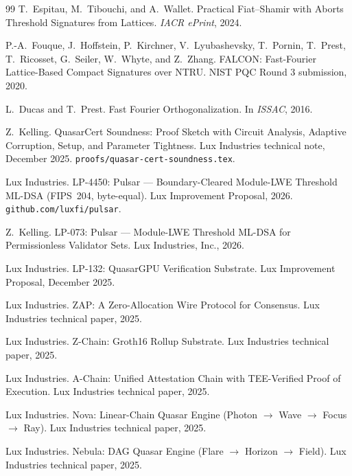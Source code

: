 \begin{thebibliography}{99}
T.~Espitau, M.~Tibouchi, and A.~Wallet.
\newblock Practical Fiat--Shamir with Aborts Threshold Signatures from
  Lattices.
\newblock \emph{IACR ePrint}, 2024.

P.-A.~Fouque, J.~Hoffstein, P.~Kirchner, V.~Lyubashevsky, T.~Pornin,
  T.~Prest, T.~Ricosset, G.~Seiler, W.~Whyte, and Z.~Zhang.
\newblock FALCON: Fast-Fourier Lattice-Based Compact Signatures over NTRU.
\newblock NIST PQC Round 3 submission, 2020.

L.~Ducas and T.~Prest.
\newblock Fast Fourier Orthogonalization.
\newblock In \emph{ISSAC}, 2016.

Z.~Kelling.
\newblock QuasarCert Soundness: Proof Sketch with Circuit Analysis,
  Adaptive Corruption, Setup, and Parameter Tightness.
\newblock Lux Industries technical note, December 2025.
\newblock \texttt{proofs/quasar-cert-soundness.tex}.

Lux Industries.
\newblock LP-4450: Pulsar --- Boundary-Cleared Module-LWE Threshold
  ML-DSA (FIPS~204, byte-equal).
\newblock Lux Improvement Proposal, 2026.
\newblock \texttt{github.com/luxfi/pulsar}.

Z.~Kelling.
\newblock LP-073: Pulsar --- Module-LWE Threshold ML-DSA for
  Permissionless Validator Sets.
\newblock Lux Industries, Inc., 2026.

Lux Industries.
\newblock LP-132: QuasarGPU Verification Substrate.
\newblock Lux Improvement Proposal, December 2025.

Lux Industries.
\newblock ZAP: A Zero-Allocation Wire Protocol for Consensus.
\newblock Lux Industries technical paper, 2025.

Lux Industries.
\newblock Z-Chain: Groth16 Rollup Substrate.
\newblock Lux Industries technical paper, 2025.

Lux Industries.
\newblock A-Chain: Unified Attestation Chain with TEE-Verified Proof
  of Execution.
\newblock Lux Industries technical paper, 2025.

Lux Industries.
\newblock Nova: Linear-Chain Quasar Engine (Photon $\to$ Wave $\to$
  Focus $\to$ Ray).
\newblock Lux Industries technical paper, 2025.

Lux Industries.
\newblock Nebula: DAG Quasar Engine (Flare $\to$ Horizon $\to$ Field).
\newblock Lux Industries technical paper, 2025.


\end{thebibliography}
